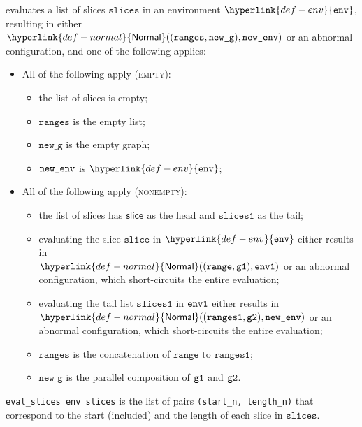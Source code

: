 \documentclass{book}
\newcommand\ProseOrAbnormal[0]{or an abnormal configuration, which short-circuits the entire evaluation}
\newcommand\Normal[0]{\hyperlink{def-normal}{\textsf{Normal}}}
\newcommand\env[0]{\hyperlink{def-env}{\texttt{env}}}
\newcommand\newg[0]{\texttt{new\_g}}
\newcommand\vslice[0]{\texttt{slice}}
\newcommand\slices[0]{\texttt{slices}}
\newcommand\slicesone[0]{\texttt{slices1}}
\newcommand\range[0]{\texttt{range}}
\newcommand\ranges[0]{\texttt{ranges}}
\newcommand\rangesone[0]{\texttt{ranges1}}
\begin{document}
evaluates a list of slices $\slices$ in an environment $\env$, resulting in either \\
$\Normal((\ranges, \newg), \newenv)$ or an abnormal configuration,
and one of the following applies:
\begin{itemize}
  \item All of the following apply (\textsc{empty}):
  \begin{itemize}
    \item the list of slices is empty;
    \item $\ranges$ is the empty list;
    \item $\newg$ is the empty graph;
    \item $\texttt{new\_env}$ is $\env$;
  \end{itemize}

  \item All of the following apply (\textsc{nonempty}):
  \begin{itemize}
    \item the list of slices has $\textsf{slice}$ as the head and $\slicesone$ as the tail;
    \item evaluating the slice $\vslice$ in $\env$ either results in \\
    $\Normal((\range, \vgone), \envone)$     \ProseOrAbnormal;
    \item evaluating the tail list $\slicesone$ in $\texttt{env1}$ either results in \\
    $\Normal((\rangesone, \vgtwo), \newenv)$ \ProseOrAbnormal;
    \item $\ranges$ is the concatenation of $\range$ to $\rangesone$;
    \item $\newg$ is the parallel composition of $\texttt{g1}$ and $\texttt{g2}$.
  \end{itemize}
\end{itemize}

\texttt{eval\_slices env slices} is the list of pairs \texttt{(start\_n, length\_n)} that
correspond to the start (included) and the length of each slice in
$\slices$.


\end{document}
